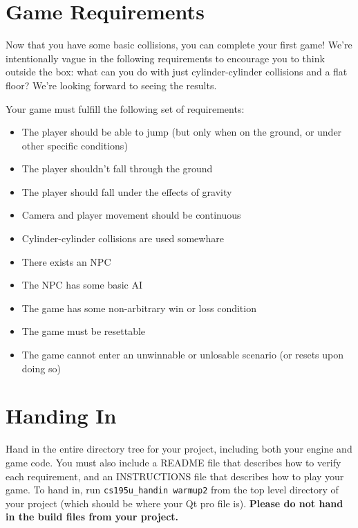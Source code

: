 \documentclass{../cs195u}
\begin{document}
  \section*{Game Requirements}
  Now that you have some basic collisions, you can complete your first game! We're intentionally vague in the following requirements to encourage you to think outside the box: what can you do with just cylinder-cylinder collisions and a flat floor? We're looking forward to seeing the results.
 
  Your game must fulfill the following set of requirements:
  \begin{itemize}
   \item The player should be able to jump (but only when on the ground, or under other specific conditions)
 \item The player shouldn't fall through the ground
 \item The player should fall under the effects of gravity
 \item Camera and player movement should be continuous
 \item Cylinder-cylinder collisions are used somewhare
 \item There exists an NPC
 \item The NPC has some basic AI
 \item The game has some non-arbitrary win or loss condition
 \item The game must be resettable
 \item The game cannot enter an unwinnable or unlosable scenario (or resets upon doing so)
  \end{itemize}

 \section*{Handing In}
Hand in the entire directory tree for your project, including both your engine and game code. You must also include a README file that describes how to verify each requirement, and an INSTRUCTIONS file that describes how to play your game. To hand in, run \texttt{cs195u\_handin warmup2} from the top level directory of your project (which should be where your Qt pro file is). \textbf{Please do not hand in the build files from your project.}
\end{document}
